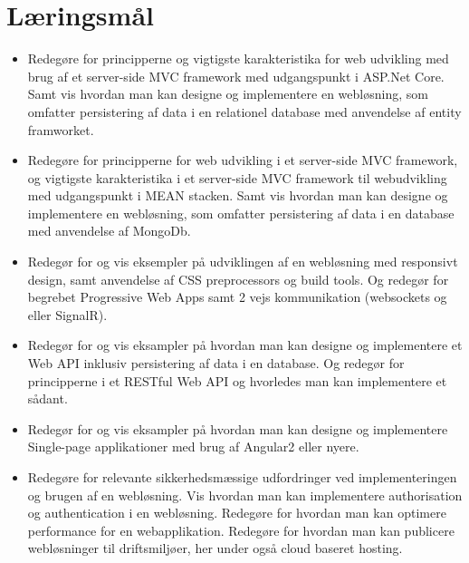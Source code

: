 \section*{Læringsmål}

\begin{itemize}
	
	\item 
	Redegøre for principperne og vigtigste karakteristika for web	udvikling med brug af et server-side MVC framework med udgangspunkt i ASP.Net Core. Samt vis hvordan man kan designe og implementere en	webløsning, som omfatter persistering af data i en relationel database med anvendelse af entity framworket.
	
	\item 
	Redegøre for principperne for web udvikling i et server-side MVC framework, og vigtigste karakteristika i et server-side	MVC framework til webudvikling med udgangspunkt i MEAN stacken.	Samt vis hvordan man kan designe og implementere en	webløsning, som omfatter persistering af data i en database	med anvendelse af MongoDb.
	
	\item 
	Redegør for og vis eksempler på udviklingen af en webløsning med responsivt design, samt anvendelse af CSS preprocessors og build tools. Og redegør for begrebet Progressive Web Apps samt 2 vejs	kommunikation (websockets og eller SignalR).
	
	\item 
	Redegør for og vis eksampler på hvordan man kan designe	og implementere et Web API inklusiv persistering af data i en database.	Og redegør for principperne i et RESTful Web API og	hvorledes man kan implementere et sådant.
		
	\item 
	Redegør for og vis eksampler på hvordan man kan designe	og implementere Single-page applikationer med brug af	Angular2 eller nyere.
	
	\item 
	Redegøre for relevante sikkerhedsmæssige udfordringer ved implementeringen og brugen af en webløsning.	Vis hvordan man kan implementere authorisation og authentication i en webløsning.	Redegøre for hvordan man kan optimere performance for en webapplikation. Redegøre for hvordan man kan publicere webløsninger til driftsmiljøer, her under også cloud baseret hosting.
	
\end{itemize}